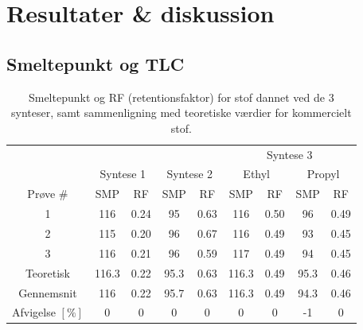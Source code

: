 \section{Resultater \& diskussion}
    \subsection{Smeltepunkt og TLC}
    \begin{table}[H]\centering
        \caption{Smeltepunkt og RF (retentionsfaktor) for stof dannet ved de 3 synteser, samt sammenligning med teoretiske værdier for kommercielt stof.}
        \begin{tabular*}{\linewidth}{c@{\extracolsep{\fill}}cccccccc}
            \toprule
            & & & & & \multicolumn{4}{c}{Syntese 3} \\
            \cmidrule(r){6-9}
            & \multicolumn{2}{c}{Syntese 1} & \multicolumn{2}{c}{Syntese 2} & \multicolumn{2}{c}{Ethyl} & \multicolumn{2}{c}{Propyl} \\
            \cmidrule(r){2-3} \cmidrule(r){4-5} \cmidrule(r){6-7} \cmidrule(r){8-9}
            Prøve \# & SMP & RF & SMP & RF & SMP & RF & SMP & RF \\
            \midrule
            1 & 116 & 0.24 & 95 & 0.63 & 116 & 0.50 & 96 & 0.49 \\
            2 & 115 & 0.20 & 96 & 0.67 & 116 & 0.49 & 93 & 0.45 \\
            3 & 116 & 0.21 & 96 & 0.59 & 117 & 0.49 & 94 & 0.45 \\
            \midrule
            Teoretisk & 116.3 & 0.22 & 95.3 & 0.63 & 116.3 & 0.49 & 95.3 & 0.46 \\
            Gennemsnit & 116 & 0.22 & 95.7 & 0.63 & 116.3 & 0.49 & 94.3 & 0.46 \\
            \midrule
            Afvigelse $\left[\si{\%}\right]$ & 0 & 0 & 0 & 0 & 0 & 0 & -1 & 0 \\
            \bottomrule
        \end{tabular*}
    \end{table}
